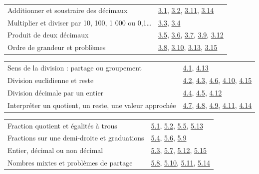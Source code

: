 \begin{tabularx}{\linewidth}{@{}Yl@{}}\toprule
Additionner et soustraire des décimaux & \hyperref[exo-3-1]{3.1}, \hyperref[exo-3-2]{3.2}, \hyperref[exo-3-11]{3.11}, \hyperref[exo-3-14]{3.14}\\[2mm]
Multiplier et diviser par 10, 100, 1 000 ou 0,1… & \hyperref[exo-3-3]{3.3}, \hyperref[exo-3-4]{3.4}\\[2mm]
Produit de deux décimaux & \hyperref[exo-3-5]{3.5}, \hyperref[exo-3-6]{3.6}, \hyperref[exo-3-7]{3.7}, \hyperref[exo-3-9]{3.9}, \hyperref[exo-3-12]{3.12}\\[2mm]
Ordre de grandeur et problèmes & \hyperref[exo-3-8]{3.8}, \hyperref[exo-3-10]{3.10}, \hyperref[exo-3-13]{3.13}, \hyperref[exo-3-15]{3.15}\\[2mm]
\bottomrule\end{tabularx}\par\vspace{4mm}
\clearpage
{}\fontsize{10}{13}\selectfont
{}\begin{tabularx}{\linewidth}{@{}Yl@{}}\toprule
Sens de la division : partage ou groupement & \hyperref[exo-4-1]{4.1}, \hyperref[exo-4-13]{4.13}\\[2mm]
Division euclidienne et reste & \hyperref[exo-4-2]{4.2}, \hyperref[exo-4-3]{4.3}, \hyperref[exo-4-6]{4.6}, \hyperref[exo-4-10]{4.10}, \hyperref[exo-4-15]{4.15}\\[2mm]
Division décimale par un entier & \hyperref[exo-4-4]{4.4}, \hyperref[exo-4-5]{4.5}, \hyperref[exo-4-12]{4.12}\\[2mm]
Interpréter un quotient, un reste, une valeur approchée & \hyperref[exo-4-7]{4.7}, \hyperref[exo-4-8]{4.8}, \hyperref[exo-4-9]{4.9}, \hyperref[exo-4-11]{4.11}, \hyperref[exo-4-14]{4.14}\\[2mm]
\bottomrule\end{tabularx}\par\vspace{4mm}
\begin{tabularx}{\linewidth}{@{}Yl@{}}\toprule
Fraction quotient et égalités à trous & \hyperref[exo-5-1]{5.1}, \hyperref[exo-5-2]{5.2}, \hyperref[exo-5-5]{5.5}, \hyperref[exo-5-13]{5.13}\\[2mm]
Fractions sur une demi-droite et graduations & \hyperref[exo-5-4]{5.4}, \hyperref[exo-5-6]{5.6}, \hyperref[exo-5-9]{5.9}\\[2mm]
Entier, décimal ou non décimal & \hyperref[exo-5-3]{5.3}, \hyperref[exo-5-7]{5.7}, \hyperref[exo-5-12]{5.12}, \hyperref[exo-5-15]{5.15}\\[2mm]
Nombres mixtes et problèmes de partage & \hyperref[exo-5-8]{5.8}, \hyperref[exo-5-10]{5.10}, \hyperref[exo-5-11]{5.11}, \hyperref[exo-5-14]{5.14}\\[2mm]
\bottomrule\end{tabularx}\par\vspace{4mm}
